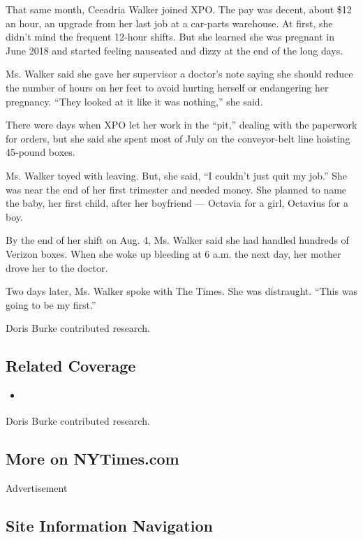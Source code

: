 That same month, Ceeadria Walker joined XPO. The pay was decent, about
\$12 an hour, an upgrade from her last job at a car-parts warehouse. At
first, she didn't mind the frequent 12-hour shifts. But she learned she
was pregnant in June 2018 and started feeling nauseated and dizzy at the
end of the long days.

Ms. Walker said she gave her supervisor a doctor's note saying she
should reduce the number of hours on her feet to avoid hurting herself
or endangering her pregnancy. ``They looked at it like it was nothing,''
she said.

There were days when XPO let her work in the ``pit,'' dealing with the
paperwork for orders, but she said she spent most of July on the
conveyor-belt line hoisting 45-pound boxes.

Ms. Walker toyed with leaving. But, she said, ``I couldn't just quit my
job.'' She was near the end of her first trimester and needed money. She
planned to name the baby, her first child, after her boyfriend ---
Octavia for a girl, Octavius for a boy.

By the end of her shift on Aug. 4, Ms. Walker said she had handled
hundreds of Verizon boxes. When she woke up bleeding at 6 a.m. the next
day, her mother drove her to the doctor.

Two days later, Ms. Walker spoke with The Times. She was distraught.
``This was going to be my first.''

Doris Burke contributed research.

\hypertarget{related-coverage}{%
\subsection{Related Coverage}\label{related-coverage}}

\begin{itemize}
\tightlist
\item
  \href{https://www.nytimes3xbfgragh.onion/interactive/2018/06/15/business/pregnancy-discrimination.html}{}
\end{itemize}

Doris Burke contributed research.

\hypertarget{more-on-nytimescom}{%
\subsection{More on NYTimes.com}\label{more-on-nytimescom}}

Advertisement

\hypertarget{site-information-navigation}{%
\subsection{Site Information
Navigation}\label{site-information-navigation}}

